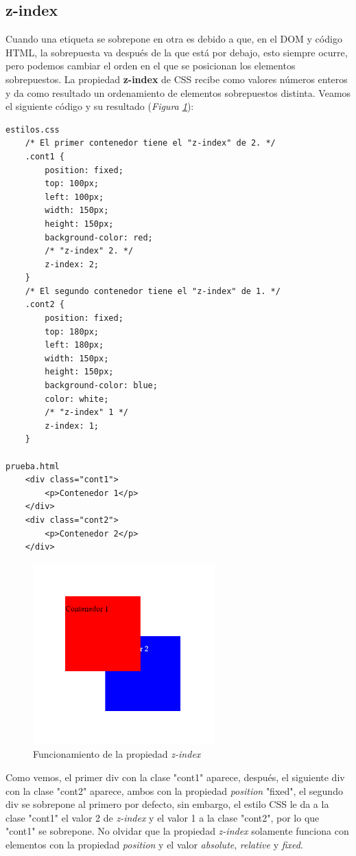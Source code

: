 \subsection{z-index}

Cuando una etiqueta se sobrepone en otra es debido a que, en el DOM y código HTML, la sobrepuesta va después de la que está por debajo, esto siempre ocurre, pero podemos cambiar el orden en el que se posicionan los elementos sobrepuestos. La propiedad \textbf{z-index} de CSS recibe como valores números enteros y da como resultado un ordenamiento de elementos sobrepuestos distinta. Veamos el siguiente código y su resultado (\textit{Figura \ref{fig: 32}}):
\begin{lstlisting}
estilos.css
    /* El primer contenedor tiene el "z-index" de 2. */
    .cont1 {
        position: fixed;
        top: 100px;
        left: 100px;
        width: 150px;
        height: 150px;
        background-color: red;
        /* "z-index" 2. */
        z-index: 2;
    }
    /* El segundo contenedor tiene el "z-index" de 1. */
    .cont2 {
        position: fixed;
        top: 180px;
        left: 180px;
        width: 150px;
        height: 150px;
        background-color: blue;
        color: white;
        /* "z-index" 1 */
        z-index: 1;
    }

prueba.html
    <div class="cont1">
        <p>Contenedor 1</p>
    </div>
    <div class="cont2">
        <p>Contenedor 2</p>
    </div>
\end{lstlisting}
\begin{figure}[H]
    \centering
    \caption{Funcionamiento de la propiedad \textit{z-index}}
    \label{fig: 32}
    \includegraphics[width=7cm]{ss/z-index.png}
\end{figure}

Como vemos, el primer div con la clase "cont1" aparece, después, el siguiente div con la clase "cont2" aparece, ambos con la propiedad \textit{position} "fixed", el segundo div se sobrepone al primero por defecto, sin embargo, el estilo CSS le da a la clase "cont1" el valor 2 de \textit{z-index} y el valor 1 a la clase "cont2", por lo que "cont1" se sobrepone. No olvidar que la propiedad \textit{z-index} solamente funciona con elementos con la propiedad \textit{position} y el valor \textit{absolute}, \textit{relative} y \textit{fixed}.
